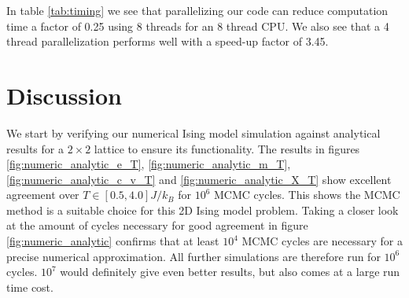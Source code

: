 \documentclass[english,notitlepage,reprint,nofootinbib]{revtex4-1}  %
\begin{document}
In table \ref{tab:timing} we see that parallelizing our code can reduce computation time a factor of 0.25 using 8 threads for an 8 thread CPU. We also see that a 4 thread parallelization performs well with a speed-up factor of 3.45.
\section{Discussion}\label{sec:discussion}
We start by verifying our numerical Ising model simulation against analytical results for a $2 \times 2$ lattice to ensure its functionality. The results in figures \ref{fig:numeric_analytic_e_T}, \ref{fig:numeric_analytic_m_T}, \ref{fig:numeric_analytic_c_v_T} and \ref{fig:numeric_analytic_X_T} show excellent agreement over $T \in [0.5, 4.0]J/k_B$ for $10^6$ MCMC cycles. This shows the MCMC method is a suitable choice for this 2D Ising model problem. Taking a closer look at the amount of cycles necessary for good agreement in figure \ref{fig:numeric_analytic} confirms that at least $10^4$ MCMC cycles are necessary for a precise numerical approximation. All further simulations are therefore run for $10^6$ cycles. $10^7$ would definitely give even better results, but also comes at a large run time cost.
\end{document}
